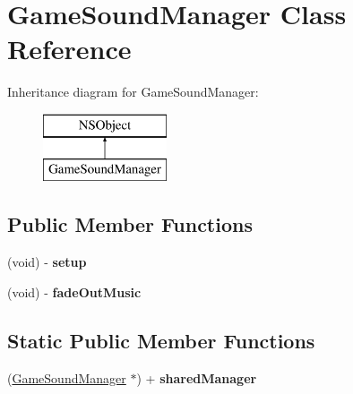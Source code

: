 \hypertarget{interface_game_sound_manager}{\section{Game\-Sound\-Manager Class Reference}
\label{interface_game_sound_manager}
}
Inheritance diagram for Game\-Sound\-Manager\-:\begin{figure}[H]
\begin{center}
\leavevmode
\includegraphics[height=2.000000cm]{interface_game_sound_manager}
\end{center}
\end{figure}
\subsection*{Public Member Functions}
\begin{DoxyCompactItemize}
\item 
\hypertarget{interface_game_sound_manager_afe6385e8bb513908f9c422fb05ada8e2}{(void) -\/ {\bfseries setup}}\label{interface_game_sound_manager_afe6385e8bb513908f9c422fb05ada8e2}

\item 
\hypertarget{interface_game_sound_manager_acd1b6634bf04f1e4fd21c1e9eccb6b5e}{(void) -\/ {\bfseries fade\-Out\-Music}}\label{interface_game_sound_manager_acd1b6634bf04f1e4fd21c1e9eccb6b5e}

\end{DoxyCompactItemize}
\subsection*{Static Public Member Functions}
\begin{DoxyCompactItemize}
\item 
\hypertarget{interface_game_sound_manager_a2e42d6b0c24015ef4d1efb5ddd121da9}{(\hyperlink{interface_game_sound_manager}{Game\-Sound\-Manager} $\ast$) + {\bfseries shared\-Manager}}\label{interface_game_sound_manager_a2e42d6b0c24015ef4d1efb5ddd121da9}

\end{DoxyCompactItemize}
